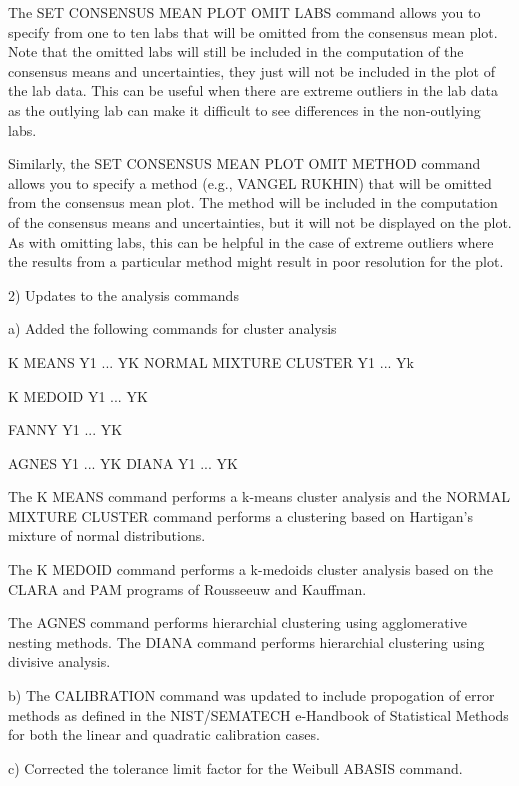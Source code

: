        The SET CONSENSUS MEAN PLOT OMIT LABS command allows you to
       specify from one to ten labs that will be omitted from the
       consensus mean plot.  Note that the omitted labs will still be
       included in the computation of the consensus means and
       uncertainties, they just will not be included in the plot of the
       lab data.  This can be useful when there are extreme outliers in
       the lab data as the outlying lab can make it difficult to see
       differences in the non-outlying labs.

       Similarly, the SET CONSENSUS MEAN PLOT OMIT METHOD command
       allows you to specify a method (e.g., VANGEL RUKHIN) that
       will be omitted from the consensus mean plot.  The method will
       be included in the computation of the consensus means and
       uncertainties, but it will not be displayed on the plot.  As
       with omitting labs, this can be helpful in the case of extreme
       outliers where the results from a particular method might
       result in poor resolution for the plot.

 2) Updates to the analysis commands

    a) Added the following commands for cluster analysis

          K MEANS Y1 ... YK
          NORMAL MIXTURE CLUSTER Y1 ... Yk

          K MEDOID Y1 ... YK

          FANNY Y1 ... YK

          AGNES Y1 ... YK
          DIANA Y1 ... YK

       The K MEANS command performs a k-means cluster analysis and the
       NORMAL MIXTURE CLUSTER command performs a clustering based on
       Hartigan's mixture of normal distributions.

       The K MEDOID command performs a k-medoids cluster analysis based
       on the CLARA and PAM programs of Rousseeuw and Kauffman.

       The AGNES command performs hierarchial clustering using
       agglomerative nesting methods.  The DIANA command performs
       hierarchial clustering using divisive analysis.

    b) The CALIBRATION command was updated to include propogation of error
       methods as defined in the NIST/SEMATECH e-Handbook of Statistical
       Methods for both the linear and quadratic calibration cases.

    c) Corrected the tolerance limit factor for the Weibull ABASIS
       command.

